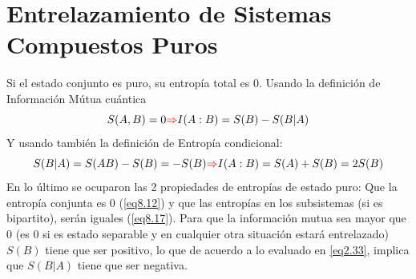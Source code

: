 \documentclass{book}
\begin{document}
\section{{Entrelazamiento de Sistemas Compuestos Puros}} Si el estado conjunto es puro, su entropía total es 0. Usando la definición de Información Mútua cuántica
\begin{equation}\label{eq8.32}{ S(A,B) =0 \textcolor{red}{\Rightarrow} I(A:B)=S(B)-S(B|A)}\end{equation}
Y usando también la definición de Entropía condicional:
\begin{equation}\label{eq8.33}{S(B|A)=S(AB)-S(B)=-S(B) \textcolor{red}{\Rightarrow} I(A:B)= S(A)+S(B)= 2S(B)}\end{equation}
En lo último se ocuparon las 2 propiedades de entropías de estado puro: Que la entropía conjunta es 0 (\ref{eq8.12}) y que las entropías en los subsistemas (si es bipartito), serán iguales (\ref{eq8.17}). Para que la información mutua sea mayor que 0 (es 0 si es estado separable y en cualquier otra situación estará entrelazado) $S(B)$ tiene que ser positivo, lo que de acuerdo a lo evaluado en \ref{eq2.33}, implica que $S(B|A)$ tiene que ser negativa.
\end{document}

